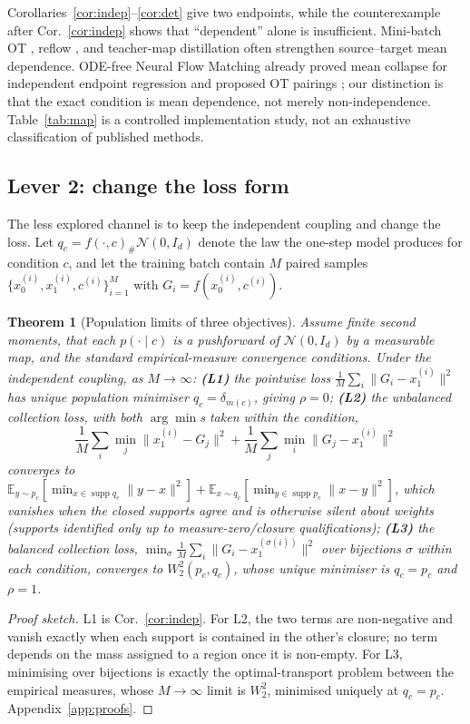 \documentclass{article}
\theoremstyle{plain}
\newtheorem{theorem}{Theorem}
\newcommand{\Eop}{\mathbb{E}}
\newcommand{\Ncal}{\mathcal{N}}
\newcommand{\supp}{\operatorname{supp}}
\begin{document}
Corollaries~\ref{cor:indep}--\ref{cor:det} give two endpoints, while the counterexample
after Cor.~\ref{cor:indep} shows that ``dependent'' alone is insufficient. Mini-batch OT
\citep{tong2024cfm}, reflow \citep{liu2023rectifiedflow}, and teacher-map distillation
often strengthen source--target mean dependence. ODE-free Neural Flow Matching already
proved mean collapse for independent endpoint regression and proposed OT pairings
\citep{shou2026nfm}; our distinction is that the exact condition is mean dependence,
not merely non-independence. Table~\ref{tab:map} is a controlled implementation study,
not an exhaustive classification of published methods.

\subsection{Lever 2: change the loss form}

The less explored channel is to keep the independent coupling and change the loss.
Let $q_c=f(\cdot,c)_\#\Ncal(0,I_d)$ denote the law the one-step model produces for
condition $c$, and let the training batch contain $M$ paired samples
$\{x_0^{(i)},x_1^{(i)},c^{(i)}\}_{i=1}^M$ with $G_i=f(x_0^{(i)},c^{(i)})$.

\begin{theorem}[Population limits of three objectives]
\label{thm:ladder}
Assume finite second moments, that each $p(\cdot\mid c)$ is a pushforward of $\Ncal(0,I_d)$
by a measurable map, and the standard empirical-measure convergence conditions.
Under the independent coupling, as $M\to\infty$:
\textbf{(L1)} the pointwise loss $\frac1M\sum_i\|G_i-x_1^{(i)}\|^2$ has unique
population minimiser $q_c=\delta_{m(c)}$, giving $\rho=0$;
\textbf{(L2)} the \emph{unbalanced} collection loss, with both $\arg\min$s taken
\emph{within the condition},
\[
  \frac1M\sum_i\min_j\|x_1^{(i)}-G_j\|^2+\frac1M\sum_j\min_i\|G_j-x_1^{(i)}\|^2
\]
converges to $\Eop_{y\sim p_c}[\min_{x\in\supp q_c}\|y-x\|^2]+\Eop_{x\sim q_c}[\min_{y\in\supp p_c}\|x-y\|^2]$,
which vanishes when the closed supports agree and is otherwise silent about weights
(supports identified only up to measure-zero/closure qualifications);
\textbf{(L3)} the \emph{balanced} collection loss, $\min_{\sigma}\frac1M\sum_i\|G_i-x_1^{(\sigma(i))}\|^2$
over bijections $\sigma$ within each condition, converges to $W_2^2(p_c,q_c)$, whose
unique minimiser is $q_c=p_c$ and $\rho=1$.
\end{theorem}
\begin{proof}[Proof sketch]
L1 is Cor.~\ref{cor:indep}. For L2, the two terms are non-negative and vanish exactly
when each support is contained in the other's closure; no term depends on the mass
assigned to a region once it is non-empty. For L3, minimising over bijections is
exactly the optimal-transport problem between the empirical measures, whose
$M\to\infty$ limit is $W_2^2$, minimised uniquely at $q_c=p_c$.
Appendix~\ref{app:proofs}.
\end{proof}
\end{document}
